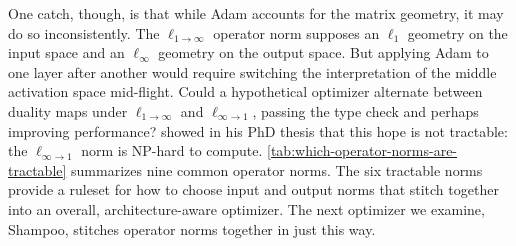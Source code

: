 One catch, though, is that while Adam accounts for the matrix geometry, it may do so inconsistently. The $\ell_{1 \to \infty}$ operator norm supposes an $\ell_1$ geometry on the input space and an $\ell_\infty$ geometry on the output space. But applying Adam to one layer after another would require switching the interpretation of the middle activation space mid-flight. Could a hypothetical optimizer alternate between duality maps under $\ell_{1 \to \infty}$ and $\ell_{\infty \to 1}$, passing the type check and perhaps improving performance? \citet{Tropp2004} showed in his PhD thesis that this hope is not tractable: the $\ell_{\infty \to 1}$ norm is NP-hard to compute. \cref{tab:which-operator-norms-are-tractable} summarizes nine common operator norms. The six tractable norms provide a ruleset for how to choose input and output norms that stitch together into an overall, architecture-aware optimizer. The next optimizer we examine, Shampoo, stitches operator norms together in just this way.

